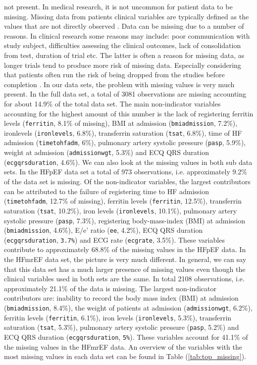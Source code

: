 \documentclass[../thesis.tex]{subfiles}
\begin{document}
\noindent not present. In medical research, it is not uncommon for patient data to be missing. Missing data from patients clinical variables are typically defined as the values that are not directly observed \citep{ibrahim2012missing}. Data can be missing due to a number of reasons. In clinical research some reasons may include: poor communication with study subject, difficulties assessing the clinical outcomes, lack of consolidation from test, duration of trial etc. The latter is often a reason for missing data, as longer trials tend to produce more risk of missing data. Especially considering that patients often run the risk of being dropped from the studies before completion \citep{myers2000handling}. In our data sets, the problem with missing values is very much present. In the full data set, a total of 3081 observations are missing accounting for about 14.9\% of the total data set. The main non-indicator variables accounting for the highest amount of this number is the lack of registering ferritin levels (\texttt{ferritin}, 8.1\% of missing), BMI at admission (\texttt{bmiadmission}, 7.2\%), ironlevels (\texttt{ironlevels}, 6.8\%), transferrin saturation (\texttt{tsat}, 6.8\%), time of HF admission (\texttt{timetohfadm}, 6\%), pulmonary artery systolic pressure (\texttt{pasp}, 5.9\%), weight at admission (\texttt{admissionwgt}, 5.3\%) and ECQ QRS duration (\texttt{ecgqrsduration}, 4.6\%). We can also look at the missing values in both sub data sets. In the HFpEF data set a total of 973 observations, i.e. approximately 9.2\% of the data set is missing. Of the non-indicator variables, the largest contributors can be attributed to the failure of registering time to HF admission (\texttt{timetohfadm}, 12.7\% of missing), ferritin levels (\texttt{ferritin}, 12.5\%), transferrin saturation (\texttt{tsat}, 10.2\%), iron levels (\texttt{ironlevels}, 10.1\%), pulmonary artery systolic pressure (\texttt{pasp}, 7.3\%), registering body-mass-index (BMI) at admission (\texttt{bmiadmission}, 4.6\%), E/e' ratio (\texttt{ee}, 4.2\%), ECQ QRS duration (\texttt{ecgqrsduration}, \texttt{3.7\%}) and ECG rate (\texttt{ecgrate}, 3.5\%). These variables contribute to approximately 68.8\% of the missing values in the HFpEF data. In the HFmrEF data set, the picture is very much different. In general, we can say that this data set has a much larger presence of missing values even though the clinical variables used in both sets are the same. In total 2108 observations, i.e. approximately 21.1\% of the data is missing. The largest non-indicator contributors are: inability to record the body mass index (BMI) at admission (\texttt{bmiadmission}, 8.4\%), the weight of patients at admission (\texttt{admissionwgt}, 6.2\%), ferritin levels (\texttt{ferritin}, 6.1\%), iron levels (\texttt{ironlevels}, 5.3\%), transferrin saturation (\texttt{tsat}, 5.3\%), pulmonary artery systolic pressure (\texttt{pasp}, 5.2\%) and ECQ QRS duration (\texttt{ecgqrsduration}, \texttt{5\%}). These variables account for 41.1\% of the missing values in the HFmrEF data. An overview of the variables with the most missing values in each data set can be found in Table (\ref{tab:top_missing}).
\end{document}
